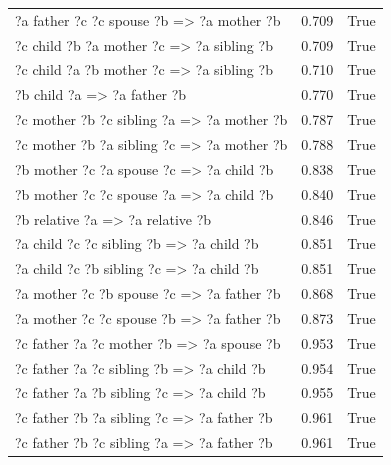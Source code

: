 \begin{longtable}{lrl}
      ?a  father  ?c  ?c  spouse  ?b   => ?a  mother  ?b &           0.709 &                     True \\
      ?c  child  ?b  ?a  mother  ?c   => ?a  sibling  ?b &           0.709 &                     True \\
      ?c  child  ?a  ?b  mother  ?c   => ?a  sibling  ?b &           0.710 &                     True \\
                       ?b  child  ?a   => ?a  father  ?b &           0.770 &                     True \\
     ?c  mother  ?b  ?c  sibling  ?a   => ?a  mother  ?b &           0.787 &                     True \\
     ?c  mother  ?b  ?a  sibling  ?c   => ?a  mother  ?b &           0.788 &                     True \\
       ?b  mother  ?c  ?a  spouse  ?c   => ?a  child  ?b &           0.838 &                     True \\
       ?b  mother  ?c  ?c  spouse  ?a   => ?a  child  ?b &           0.840 &                     True \\
                  ?b  relative  ?a   => ?a  relative  ?b &           0.846 &                     True \\
       ?a  child  ?c  ?c  sibling  ?b   => ?a  child  ?b &           0.851 &                     True \\
       ?a  child  ?c  ?b  sibling  ?c   => ?a  child  ?b &           0.851 &                     True \\
      ?a  mother  ?c  ?b  spouse  ?c   => ?a  father  ?b &           0.868 &                     True \\
      ?a  mother  ?c  ?c  spouse  ?b   => ?a  father  ?b &           0.873 &                     True \\
      ?c  father  ?a  ?c  mother  ?b   => ?a  spouse  ?b &           0.953 &                     True \\
      ?c  father  ?a  ?c  sibling  ?b   => ?a  child  ?b &           0.954 &                     True \\
      ?c  father  ?a  ?b  sibling  ?c   => ?a  child  ?b &           0.955 &                     True \\
     ?c  father  ?b  ?a  sibling  ?c   => ?a  father  ?b &           0.961 &                     True \\
     ?c  father  ?b  ?c  sibling  ?a   => ?a  father  ?b &           0.961 &                     True \\

\end{longtable}

